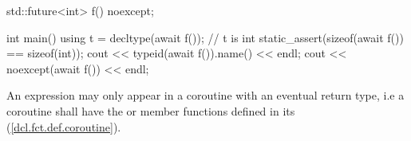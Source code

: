 \enterexample
\begin{codeblock}	
std::future<int> f() noexcept;
	
int main() {
  using t = decltype(await f()); // t is int
  static_assert(sizeof(await f()) == sizeof(int));
  cout << typeid(await f()).name() << endl;
  cout << noexcept(await f()) << endl;
}
\end{codeblock}
\exitexample%

\pnum
An  expression may only appear in a coroutine 
with an eventual return type, i.e a coroutine shall have the  or  member
functions defined in its  (\ref{dcl.fct.def.coroutine}).
